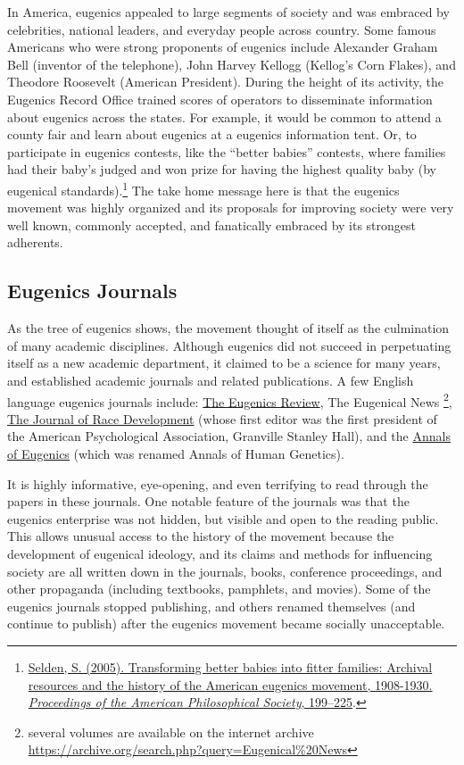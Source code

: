 \documentclass[
  oneside,
  12pt]{crumpbook}
\begin{document}
In America, eugenics appealed to large segments of society and was embraced by celebrities, national leaders, and everyday people across country. Some famous Americans who were strong proponents of eugenics include Alexander Graham Bell (inventor of the telephone), John Harvey Kellogg (Kellog's Corn Flakes), and Theodore Roosevelt (American President). During the height of its activity, the Eugenics Record Office trained scores of operators to disseminate information about eugenics across the states. For example, it would be common to attend a county fair and learn about eugenics at a eugenics information tent. Or, to participate in eugenics contests, like the ``better babies'' contests, where families had their baby's judged and won prize for having the highest quality baby (by eugenical standards).\footnote{\protect\hyperlink{ref-seldenTransformingBetterBabies2005}{Selden, S. (2005). Transforming better babies into fitter families: {Archival} resources and the history of the {American} eugenics movement, 1908-1930. \emph{Proceedings of the American Philosophical Society}, 199--225}.} The take home message here is that the eugenics movement was highly organized and its proposals for improving society were very well known, commonly accepted, and fanatically embraced by its strongest adherents.

\hypertarget{eugenics-journals}{%
\subsection{Eugenics Journals}\label{eugenics-journals}}

As the tree of eugenics shows, the movement thought of itself as the culmination of many academic disciplines. Although eugenics did not succeed in perpetuating itself as a new academic department, it claimed to be a science for many years, and established academic journals and related publications. A few English language eugenics journals include: \href{https://www.ncbi.nlm.nih.gov/pmc/journals/1186/}{The Eugenics Review}, The Eugenical News \footnote{several volumes are available on the internet archive \url{https://archive.org/search.php?query=Eugenical\%20News}}, \href{https://www.jstor.org/journal/jracedeve}{The Journal of Race Development} (whose first editor was the first president of the American Psychological Association, Granville Stanley Hall), and the \href{https://onlinelibrary.wiley.com/toc/20501439/1925/1/1}{Annals of Eugenics} (which was renamed Annals of Human Genetics).

It is highly informative, eye-opening, and even terrifying to read through the papers in these journals. One notable feature of the journals was that the eugenics enterprise was not hidden, but visible and open to the reading public. This allows unusual access to the history of the movement because the development of eugenical ideology, and its claims and methods for influencing society are all written down in the journals, books, conference proceedings, and other propaganda (including textbooks, pamphlets, and movies). Some of the eugenics journals stopped publishing, and others renamed themselves (and continue to publish) after the eugenics movement became socially unacceptable.
\end{document}
